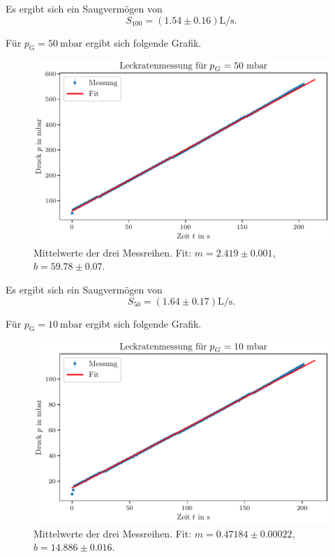 Es ergibt sich ein Saugvermögen von
\begin{equation}
    S_{100} = (\num{1.54} \pm \num{0.16}) \si{\liter\per\second}.
\end{equation}

Für $p_\text{G} = \SI{50}{\milli\bar}$ ergibt sich folgende Grafik.

\begin{figure}[H]
    \centering
    \includegraphics[width=\textwidth]{plots/DP_Leck_50mbar.pdf}
    \caption{Mittelwerte der drei Messreihen. Fit: $m = \num{2.419} \pm \num{0.001}$, $b = \num{59.78} \pm \num{0.07}$.}
    \label{fig:DP_Leck_50mbar_mittelwert}
\end{figure}

Es ergibt sich ein Saugvermögen von
\begin{equation}
    S_{50} = (\num{1.64} \pm \num{0.17}) \si{\liter\per\second}.
\end{equation}

Für $p_\text{G} = \SI{10}{\milli\bar}$ ergibt sich folgende Grafik.

\begin{figure}[H]
    \centering
    \includegraphics[width=\textwidth]{plots/DP_Leck_10mbar.pdf}
    \caption{Mittelwerte der drei Messreihen. Fit: $m = \num{0.47184} \pm \num{0.00022}$, $b = \num{14.886} \pm \num{0.016}$.}
    \label{fig:DP_Leck_10mbar_mittelwert}
\end{figure}

